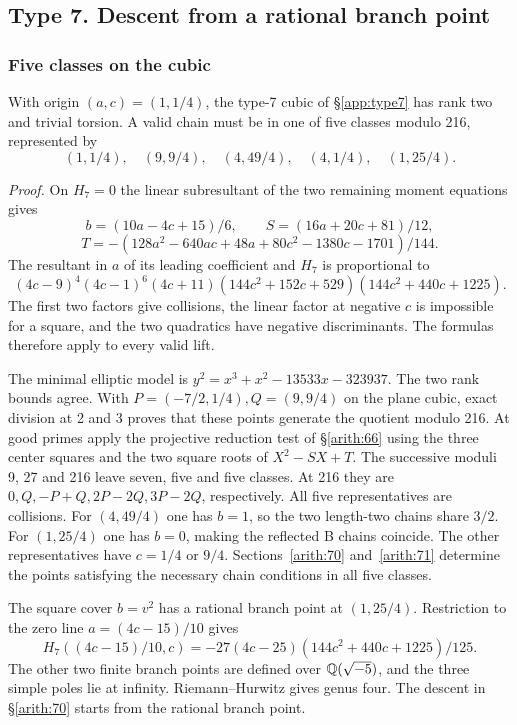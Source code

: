 \subsection{Type 7. Descent from a rational branch point}\label{detail:type7}

\subsubsection{Five classes on the cubic}\label{arith:69}

With origin \((a,c)=(1,1/4)\), the type-7 cubic
of \S\ref{app:type7} has rank two and trivial torsion. A valid chain must be in
one of five classes modulo 216, represented by
\[(1,1/4),\quad(9,9/4),\quad(4,49/4),\quad(4,1/4),\quad(1,25/4).\]

\emph{Proof.} On \(H_7=0\) the linear subresultant of the two remaining
moment equations gives
\[b=(10a-4c+15)/6,\qquad S=(16a+20c+81)/12,\]\[
 T=-(128a^2-640ac+48a+80c^2-1380c-1701)/144 .\]
The resultant in \(a\) of its leading coefficient and \(H_7\) is
proportional to
\[(4c-9)^4(4c-1)^6(4c+11)
 (144c^2+152c+529)(144c^2+440c+1225).\]
The first two factors give collisions, the linear factor at negative
\(c\) is impossible for a square, and the two quadratics have negative
discriminants. The formulas therefore apply to every valid lift.

The minimal elliptic model is \(y^2=x^3+x^2-13533x-323937\).
The two rank bounds agree. With
\(P=(-7/2,1/4),Q=(9,9/4)\) on the plane cubic, exact division at
2 and 3 proves that these points generate the quotient modulo 216.
At good primes apply the projective reduction test of \S\ref{arith:66} using
the three center squares and the two square roots of \(X^2-SX+T\).
The successive moduli 9, 27 and 216 leave seven, five and five
classes. At 216 they are \(0,Q,-P+Q,2P-2Q,3P-2Q\), respectively.
All five representatives are collisions. For \((4,49/4)\) one has
\(b=1\), so the two length-two chains share \(3/2\). For
\((1,25/4)\) one has \(b=0\), making the reflected B chains
coincide. The other representatives have \(c=1/4\) or \(9/4\).
Sections~\ref{arith:70} and~\ref{arith:71} determine the points satisfying the necessary chain conditions in all five classes.

The square cover \(b=v^2\) has a rational branch point at
\((1,25/4)\). Restriction to the zero line
\(a=(4c-15)/10\) gives
\[H_7((4c-15)/10,c)=-27(4c-25)(144c^2+440c+1225)/125.\]
The other two finite branch points are defined over
\(\mathbb Q(\sqrt{-5})\), and the three simple poles lie at infinity.
Riemann--Hurwitz gives genus four. The descent in \S\ref{arith:70} starts from the rational branch point.

